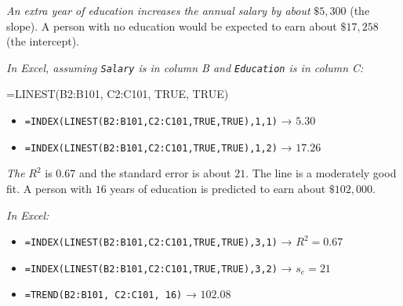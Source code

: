 \documentclass[
  11pt,
  letterpaper,
  DIV=11,
  numbers=noendperiod,
  oneside,
  open=any]{scrreprt}
\newenvironment{Shaded}{\begin{snugshade}}{\end{snugshade}}
\newcommand{\NormalTok}[1]{\textcolor[rgb]{0.00,0.23,0.31}{#1}}
\providecommand{\tightlist}{%
  \setlength{\itemsep}{0pt}\setlength{\parskip}{0pt}}\usepackage{longtable,booktabs,array}
\newenvironment{bsanswerkey}[2]{%
  \begin{tcolorbox}[bsbase, colback=bspaper2, colframe=bsline, fontupper=\small,
    title={\hypertarget{a-#1}{}\label{a-#1}\hyperlink{q-#1}{\textcolor{bsink2}{\MakeUppercase{#2}}}\hfill
      \hyperlink{q-#1}{\textcolor{bsaccent}{\normalfont\footnotesize back to page \pageref{q-#1}}}}]}%
  {\end{tcolorbox}}
\begin{document}
\begin{bsanswerkey}{bsans62}{Exercise 2, question 1}

\emph{An extra year of education increases the annual salary by about}
\(\$5,300\) (the slope). A person with no education would be expected to
earn about \(\$17,258\) (the intercept).

\emph{In Excel, assuming \texttt{Salary} is in column B and
\texttt{Education} is in column C:}

\begin{Shaded}
\begin{Highlighting}[]
\NormalTok{=LINEST(B2:B101, C2:C101, TRUE, TRUE)}
\end{Highlighting}
\end{Shaded}

\begin{itemize}
\tightlist
\item
  \texttt{=INDEX(LINEST(B2:B101,C2:C101,TRUE,TRUE),1,1)} → \(5.30\)
\item
  \texttt{=INDEX(LINEST(B2:B101,C2:C101,TRUE,TRUE),1,2)} → \(17.26\)
\end{itemize}

\end{bsanswerkey}

\begin{bsanswerkey}{bsans63}{Exercise 2, question 2}

\emph{The} \(R^2\) is \(0.67\) and the standard error is about \(21\).
The line is a moderately good fit. A person with \(16\) years of
education is predicted to earn about \(\$102,000\).

\emph{In Excel:}

\begin{itemize}
\tightlist
\item
  \texttt{=INDEX(LINEST(B2:B101,C2:C101,TRUE,TRUE),3,1)} →
  \(R^2 = 0.67\)
\item
  \texttt{=INDEX(LINEST(B2:B101,C2:C101,TRUE,TRUE),3,2)} → \(s_e = 21\)
\item
  \texttt{=TREND(B2:B101,\ C2:C101,\ 16)} → \(102.08\)
\end{itemize}

\end{bsanswerkey}
\end{document}
